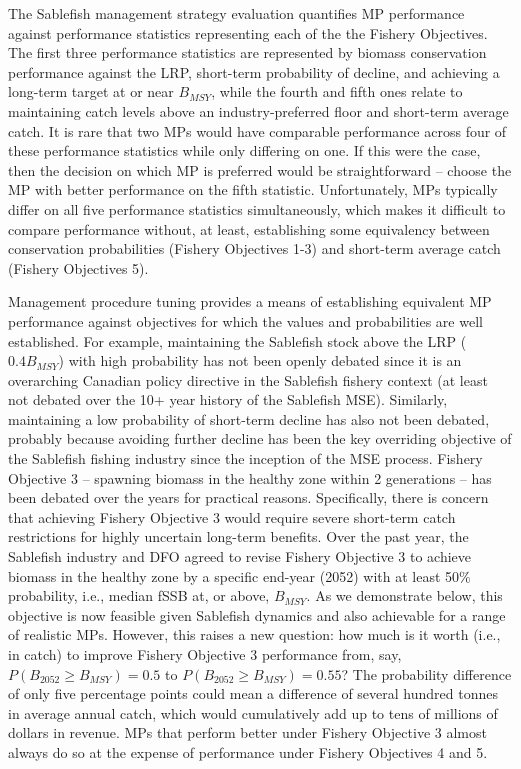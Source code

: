 \documentclass[11pt]{book}
\begin{document}
The Sablefish management strategy evaluation quantifies MP performance against performance statistics representing each of the the Fishery Objectives. The first three performance statistics are represented by biomass conservation performance against the LRP, short-term probability of decline, and achieving a long-term target at or near \(B_{MSY}\), while the fourth and fifth ones relate to maintaining catch levels above an industry-preferred floor and short-term average catch. It is rare that two MPs would have comparable performance across four of these performance statistics while only differing on one. If this were the case, then the decision on which MP is preferred would be straightforward -- choose the MP with better performance on the fifth statistic. Unfortunately, MPs typically differ on all five performance statistics simultaneously, which makes it difficult to compare performance without, at least, establishing some equivalency between conservation probabilities (Fishery Objectives 1-3) and short-term average catch (Fishery Objectives 5).

Management procedure tuning provides a means of establishing equivalent MP performance against objectives for which the values and probabilities are well established. For example, maintaining the Sablefish stock above the LRP (\(0.4B_{MSY}\)) with high probability has not been openly debated since it is an overarching Canadian policy directive in the Sablefish fishery context (at least not debated over the 10+ year history of the Sablefish MSE). Similarly, maintaining a low probability of short-term decline has also not been debated, probably because avoiding further decline has been the key overriding objective of the Sablefish fishing industry since the inception of the MSE process. Fishery Objective 3 -- spawning biomass in the healthy zone within 2 generations -- has been debated over the years for practical reasons. Specifically, there is concern that achieving Fishery Objective 3 would require severe short-term catch restrictions for highly uncertain long-term benefits. Over the past year, the Sablefish industry and DFO agreed to revise Fishery Objective 3 to achieve biomass in the healthy zone by a specific end-year (2052) with at least 50\% probability, i.e., median fSSB at, or above, \(B_{MSY}\). As we demonstrate below, this objective is now feasible given Sablefish dynamics and also achievable for a range of realistic MPs. However, this raises a new question: how much is it worth (i.e., in catch) to improve Fishery Objective 3 performance from, say, \(P(B_{2052} \geq B_{MSY}) = 0.5\) to \(P(B_{2052} \geq B_{MSY}) = 0.55\)? The probability difference of only five percentage points could mean a difference of several hundred tonnes in average annual catch, which would cumulatively add up to tens of millions of dollars in revenue. MPs that perform better under Fishery Objective 3 almost always do so at the expense of performance under Fishery Objectives 4 and 5.
\end{document}
